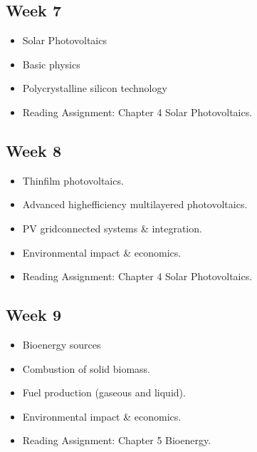 \documentclass[letterpaper,10pt,english]{jupyterBook}
\begin{document}
\subsection{Week 7}
\label{\detokenize{Syllabus:week-7}}\begin{itemize}
\item {} 
\sphinxAtStartPar
Solar Photovoltaics

\item {} 
\sphinxAtStartPar
Basic physics

\item {} 
\sphinxAtStartPar
Polycrystalline silicon technology

\item {} 
\sphinxAtStartPar
Reading Assignment: Chapter 4 \sphinxhyphen{} Solar Photovoltaics.

\end{itemize}


\subsection{Week 8}
\label{\detokenize{Syllabus:week-8}}\begin{itemize}
\item {} 
\sphinxAtStartPar
Thin\sphinxhyphen{}film photovoltaics.

\item {} 
\sphinxAtStartPar
Advanced high\sphinxhyphen{}efficiency multi\sphinxhyphen{}layered photovoltaics.

\item {} 
\sphinxAtStartPar
PV grid\sphinxhyphen{}connected systems \& integration.

\item {} 
\sphinxAtStartPar
Environmental impact \& economics.

\item {} 
\sphinxAtStartPar
Reading Assignment: Chapter 4 \sphinxhyphen{} Solar Photovoltaics.

\end{itemize}


\subsection{Week 9}
\label{\detokenize{Syllabus:week-9}}\begin{itemize}
\item {} 
\sphinxAtStartPar
Bioenergy sources

\item {} 
\sphinxAtStartPar
Combustion of solid biomass.

\item {} 
\sphinxAtStartPar
Fuel production (gaseous and liquid).

\item {} 
\sphinxAtStartPar
Environmental impact \& economics.

\item {} 
\sphinxAtStartPar
Reading Assignment: Chapter 5 \sphinxhyphen{} Bioenergy.

\end{itemize}
\end{document}
